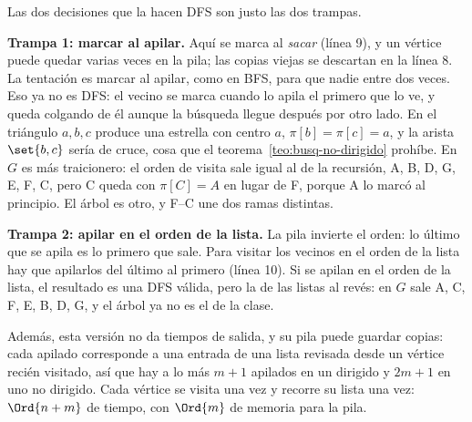 \documentclass[11pt,letterpaper]{article}
\begin{document}
Las dos decisiones que la hacen DFS son justo las dos trampas.

\textbf{Trampa 1: marcar al apilar.} Aquí se marca al \textit{sacar}
(línea 9), y un vértice puede quedar varias veces en la pila; las
copias viejas se descartan en la línea 8. La tentación es marcar al
apilar, como en BFS, para que nadie entre dos veces. Eso ya no es DFS:
el vecino se marca cuando lo apila el primero que lo ve, y queda
colgando de él aunque la búsqueda llegue después por otro lado. En el
triángulo $a, b, c$ produce una estrella con centro $a$,
$\pi[b] = \pi[c] = a$, y la arista $\set{b, c}$ sería de cruce, cosa
que el teorema~\ref{teo:busq-no-dirigido} prohíbe. En $G$ es más
traicionero: el orden de visita sale igual al de la recursión, A, B,
D, G, E, F, C, pero C queda con $\pi[C] = A$ en lugar de F, porque A
lo marcó al principio. El árbol es otro, y F--C une dos ramas
distintas.

\textbf{Trampa 2: apilar en el orden de la lista.} La pila invierte el
orden: lo último que se apila es lo primero que sale. Para visitar los
vecinos en el orden de la lista hay que apilarlos del último al
primero (línea 10). Si se apilan en el orden de la lista, el resultado
es una DFS válida, pero la de las listas al revés: en $G$ sale A, C,
F, E, B, D, G, y el árbol ya no es el de la clase.

Además, esta versión no da tiempos de salida, y su pila puede guardar
copias: cada apilado corresponde a una entrada de una lista revisada
desde un vértice recién visitado, así que hay a lo más $m + 1$
apilados en un dirigido y $2m + 1$ en uno no dirigido. Cada vértice se
visita una vez y recorre su lista una vez: $\Ord{n + m}$ de tiempo,
con $\Ord{m}$ de memoria para la pila.
\end{document}
